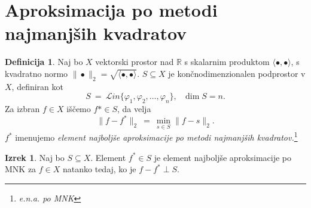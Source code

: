 \documentclass[11pt]{article}
\newcommand{\R}{\mathbb{R}}
\theoremstyle{definition}
\newtheorem{definicija}{Definicija}[section]
\theoremstyle{definition}
\newtheorem{izrek}{Izrek}[section]
\begin{document}
\pagebreak


\section{Aproksimacija po metodi najmanjših kvadratov}
\vspace{0.5cm}

\begin{definicija}

Naj bo $X$ vektorski prostor nad $\R$ s skalarnim produktom $\langle \bullet, \bullet \rangle$, s kvadratno normo $\|\bullet\|_2 = \sqrt{\langle \bullet, \bullet \rangle}$. $S \subseteq X$ je končnodimenzionalen podprostor v $X$, definiran kot
$$S ~=~ \mathcal{L}\textit{in}\{\varphi_1, \varphi_2, \ldots, \varphi_n\}, ~~~\dim{S} = n.$$
Za izbran $f \in X$ iščemo $f* \in S$, da velja
$$\|f - f^*\|_2 ~=~ \min_{s \in S}\|f - s\|_2.$$
$f^*$ imenujemo \textit{element najboljše aproksimacije po metodi najmanjših kvadratov.}\footnote{\textit{e.n.a. po MNK}}

\end{definicija}
\vspace{0.5cm}

\begin{izrek}

Naj bo $S \subseteq X.$ Element $f^* \in S$ je element najboljše aproksimacije po MNK za $f \in X$ natanko tedaj, ko je $f - f^* \perp S$.

\end{izrek}
\vspace{0.5cm}
\end{document}
